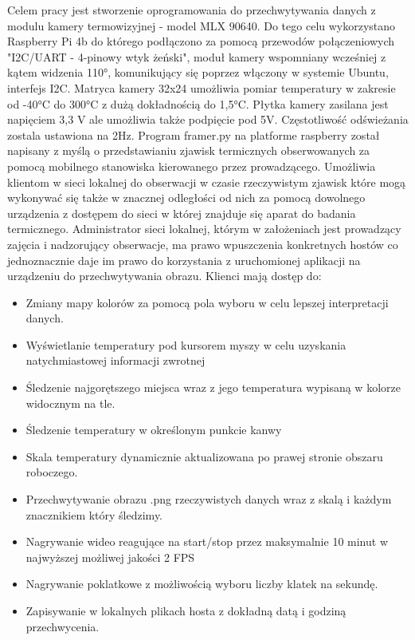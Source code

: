 \documentclass[a4paper,twoside,12pt]{book}
\begin{document}
Celem pracy jest stworzenie oprogramowania do przechwytywania danych z modulu kamery termowizyjnej - model MLX 90640. Do tego celu wykorzystano Raspberry Pi 4b do którego podłączono za pomocą przewodów połączeniowych "I2C/UART - 4-pinowy wtyk żeński", moduł kamery wspomniany wcześniej z kątem widzenia 110°, komunikujący się poprzez włączony w systemie Ubuntu, interfejs I2C. Matryca kamery 32x24 umożliwia pomiar temperatury w zakresie od -40°C do 300°C z dużą dokładnością do 1,5°C. Płytka kamery zasilana jest napięciem 3,3 V ale umożliwia także podpięcie pod 5V. Częstotliwość odświeżania zostala ustawiona na 2Hz. Program framer.py na platforme raspberry został napisany z myślą o przedstawianiu zjawisk termicznych obserwowanych za pomocą mobilnego stanowiska kierowanego przez prowadzącego. Umożliwia klientom w sieci lokalnej do obserwacji w czasie rzeczywistym zjawisk które mogą wykonywać się także w znacznej odległości od nich za pomocą dowolnego urządzenia z dostępem do sieci w której znajduje się aparat do badania termicznego. Administrator sieci lokalnej, którym w założeniach jest prowadzący zajęcia i nadzorujący obserwacje, ma prawo wpuszczenia konkretnych hostów co jednoznacznie daje im prawo do korzystania z uruchomionej aplikacji na urządzeniu do przechwytywania obrazu. Klienci mają dostęp do:
\begin{itemize}
\item Zmiany mapy kolorów za pomocą pola wyboru w celu lepszej interpretacji danych.
\item Wyświetlanie temperatury pod kursorem myszy w celu uzyskania natychmiastowej informacji zwrotnej
\item Śledzenie najgorętszego miejsca wraz z jego temperatura wypisaną w kolorze widocznym na tle.
\item Śledzenie temperatury w określonym punkcie kanwy
\item Skala temperatury dynamicznie aktualizowana po prawej stronie obszaru roboczego.
\item Przechwytywanie obrazu .png rzeczywistych danych wraz z skalą i każdym znacznikiem który śledzimy.
\item Nagrywanie wideo reagujące na start/stop przez maksymalnie 10 minut w najwyższej możliwej jakości 2 FPS
\item Nagrywanie poklatkowe z możliwością wyboru liczby klatek na sekundę.
\item Zapisywanie w lokalnych plikach hosta z dokładną datą i godziną przechwycenia.
\end{itemize}
\end{document}
